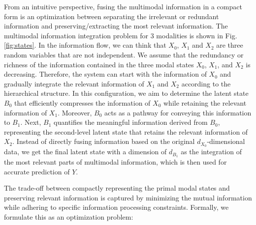 \documentclass{article} %
\begin{document}
From an intuitive perspective, fusing the multimodal information in a compact form is an optimization between separating the irrelevant or redundant information and preserving/extracting the most relevant information. The multimodal information integration problem for 3 modalities is shown in Fig. \ref{fig:states}. In the information flow, we can think that $X_{0}$, $X_{1}$ and $X_{2}$ are three random variables that are not independent. We assume that the redundancy or richness of the information contained in the three modal states $X_{0}$, $X_{1}$, and $X_{2}$ is decreasing. Therefore, the system can start with the information of $X_{0}$ and gradually integrate the relevant information of $X_{1}$ and $X_{2}$ according to the hierarchical structure. In this configuration, we aim to determine the latent state $B_{0}$ that efficiently compresses the information of $X_{0}$ while retaining the relevant information of $X_{1}$. Moreover, $B_{0}$ acts as a pathway for conveying this information to $B_{1}$. Next, ${B_{1}}$ quantifies the meaningful information derived from ${B_{0}}$, representing the second-level latent state that retains the relevant information of $X_{2}$. Instead of directly fusing information based on the original $d_{X_{0}}$-dimensional data, we get the final latent state with a dimension of $d_{B_{1}}$ as the integration of the most relevant parts of multimodal information, which is then used for accurate prediction of $Y$. 

The trade-off between compactly representing the primal modal states and preserving relevant information is captured by minimizing the mutual information while adhering to specific information processing constraints. Formally, we formulate this as an optimization problem:


\end{document}
